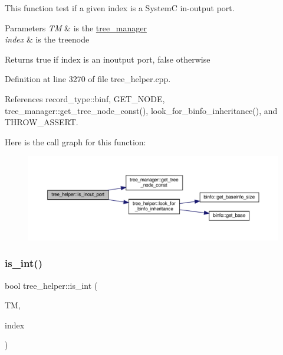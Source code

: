 This function test if a given index is a SystemC in-\/output port. 


\begin{DoxyParams}{Parameters}
{\em TM} & is the \hyperlink{classtree__manager}{tree\+\_\+manager} \\
\hline
{\em index} & is the treenode \\
\hline
\end{DoxyParams}
\begin{DoxyReturn}{Returns}
true if index is an inoutput port, false otherwise 
\end{DoxyReturn}


Definition at line 3270 of file tree\+\_\+helper.\+cpp.



References record\+\_\+type\+::binf, G\+E\+T\+\_\+\+N\+O\+DE, tree\+\_\+manager\+::get\+\_\+tree\+\_\+node\+\_\+const(), look\+\_\+for\+\_\+binfo\+\_\+inheritance(), and T\+H\+R\+O\+W\+\_\+\+A\+S\+S\+E\+RT.

Here is the call graph for this function\+:
\nopagebreak
\begin{figure}[H]
\begin{center}
\leavevmode
\includegraphics[width=350pt]{d7/d99/classtree__helper_aca402a84a9a7795074b170a5bc578a69_cgraph}
\end{center}
\end{figure}
\mbox{\label{classtree__helper_a0e90b9e4f5363c7ff726cbeaa8cc8f53}} 
\subsubsection{\texorpdfstring{is\+\_\+int()}{is\_int()}}
{\footnotesize\ttfamily bool tree\+\_\+helper\+::is\+\_\+int (\begin{DoxyParamCaption}\item[{const \hyperlink{tree__manager_8hpp_a792e3f1f892d7d997a8d8a4a12e39346}{tree\+\_\+manager\+Const\+Ref} \&}]{TM,  }\item[{const unsigned int}]{index }\end{DoxyParamCaption})\hspace{0.3cm}{\ttfamily [static]}}



